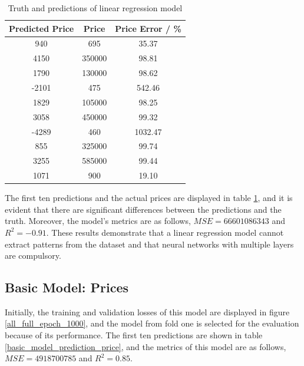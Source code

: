 \documentclass[12pt,twoside]{report}
\begin{document}
\begin{table}[H]
	\centering
	\caption{Truth and predictions of linear regression model}
	\label{linear_regression_predictions}
	\begin{tabular}{| c | c | c |}
		\hline
		Predicted Price & Price & Price Error  / \%\\ 
		\hline
		940 & 695 & 35.37 \\
		\hline
		4150 & 350000 & 98.81 \\
		\hline
		1790 & 130000 & 98.62 \\
		\hline
		-2101 & 475 & 542.46 \\
		\hline
		1829 & 105000 & 98.25 \\
		\hline
		3058 & 450000 & 99.32 \\
		\hline
		-4289 & 460 & 1032.47 \\
		\hline
		855 & 325000 & 99.74 \\
		\hline
		3255 & 585000 & 99.44 \\
		\hline
		1071 & 900 & 19.10 \\
		\hline
	\end{tabular}
\end{table}

The first ten predictions and the actual prices are displayed in table \ref{linear_regression_predictions}, and it is evident that there are significant differences between the predictions and the truth. Moreover, the model's metrics are as follows, $MSE = 66601086343$ and $R^2 = -0.91$. These results demonstrate that a linear regression model cannot extract patterns from the dataset and that neural networks with multiple layers are compulsory.

\subsection{Basic Model: Prices}
Initially, the training and validation losses of this model are displayed in figure \ref{all_full_epoch_1000}, and the model from fold one is selected for the evaluation because of its performance. The first ten predictions are shown in table \ref{basic_model_prediction_price}, and the metrics of this model are as follows, $MSE = 4918700785$ and $R^2 = 0.85$. 
\end{document}
